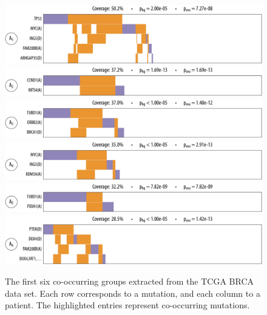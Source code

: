 \begin{figure}[htbp]
\centering
\includegraphics[width=\textwidth]{figures/genes/brca_1_a.pdf}\\[2em]
\includegraphics[width=\textwidth]{figures/genes/brca_11_a.pdf}\\[2em]
\includegraphics[width=\textwidth]{figures/genes/brca_7_a.pdf}\\[2em]
\includegraphics[width=\textwidth]{figures/genes/brca_8_a.pdf}\\[2em]
\includegraphics[width=\textwidth]{figures/genes/brca_14_a.pdf}\\[2em]
\includegraphics[width=\textwidth]{figures/genes/brca_4_a.pdf}\\[2em]
\caption{The first six co-occurring groups extracted from the TCGA BRCA data set.
Each row corresponds to a mutation, and each column to a patient.
The highlighted entries represent co-occurring mutations.}
\label{fig:att_brca_1}
\end{figure}

